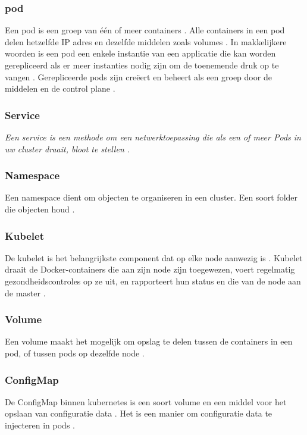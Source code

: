 \subsubsection{pod}
Een pod is een groep van één of meer containers \autocite{habbal-2020}.
Alle containers in een pod delen hetzelfde IP adres en dezelfde middelen zoals volumes \autocite{hohn-2020}.
In makkelijkere woorden is een pod een enkele instantie van een applicatie die kan worden gerepliceerd als er meer instanties nodig zijn om de toenemende druk op te vangen \autocite{habbal-2020}.
Gerepliceerde pods zijn creëert en beheert als een groep door de middelen en de control plane \textcite{KubernetesDocs-2023}.

\subsubsection{Service}
\textit{Een service is een methode om een netwerktoepassing die als een of meer Pods in uw cluster draait, bloot te stellen \autocite{KubernetesDocs-2023}.}

\subsubsection{Namespace}
Een namespace dient om objecten te organiseren in een cluster.
Een soort folder die objecten houd \autocite{burns-2022}.

\subsubsection{Kubelet}
De kubelet is het belangrijkste component dat op elke node aanwezig is \autocite{Vayghan2019}.
Kubelet draait de Docker-containers die aan zijn node zijn toegewezen, voert regelmatig gezondheidscontroles op ze uit, en rapporteert hun status en die van de node aan de master \autocite{Vayghan2019}.

\subsubsection{Volume}
Een volume maakt het mogelijk om opslag te delen tussen de containers in een pod, of tussen pods op dezelfde node \autocite{Baier2017}.

\subsubsection{ConfigMap}
De ConfigMap binnen kubernetes is een soort volume en een middel voor het opslaan van configuratie data \autocite{KubernetesDocs-2023}.
Het is een manier om configuratie data te injecteren in pods \autocite{KubernetesDocs-2023}.

